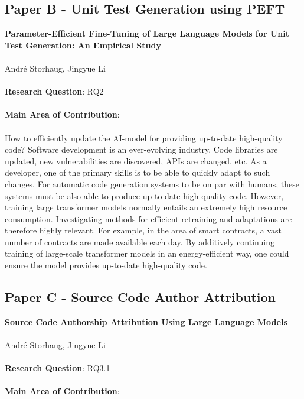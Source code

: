 \documentclass[12pt]{book}
\begin{document}
\subsection{Paper B - Unit Test Generation using PEFT}
\textbf{Parameter-Efficient Fine-Tuning of Large Language Models for Unit Test Generation: An Empirical Study}\\\\
\noindent Andr\'e Storhaug, Jingyue Li\\\\
\noindent \textbf{Research Question}: RQ2\\\\
\noindent \textbf{Main Area of Contribution}: \\\\

How to efficiently update the AI-model for providing up-to-date high-quality code?
Software development is an ever-evolving industry. Code libraries are updated, new vulnerabilities are discovered, APIs are changed, etc. As a developer, one of the primary skills is to be able to quickly adapt to such changes. For automatic code generation systems to be on par with humans, these systems must be also able to produce up-to-date high-quality code. However, training large transformer models normally entails an extremely high resource consumption. Investigating methods for efficient retraining and adaptations are therefore highly relevant. For example, in the area of smart contracts, a vast number of contracts are made available each day. By additively continuing training of large-scale transformer models in an energy-efficient way, one could ensure the model provides up-to-date high-quality code.

\subsection{Paper C - Source Code Author Attribution}

\textbf{Source Code Authorship Attribution Using Large Language Models}\\\\
\noindent Andr\'e Storhaug, Jingyue Li\\\\
\noindent \textbf{Research Question}: RQ3.1\\\\
\noindent \textbf{Main Area of Contribution}: \\\\
\end{document}
